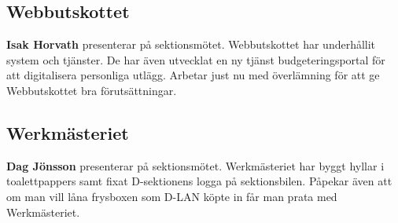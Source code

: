 \documentclass[../protokoll_varmote_2022.tex]{subfiles}
\begin{document}
\subsection{Webbutskottet}
\textbf{Isak Horvath} presenterar på sektionsmötet.
Webbutskottet har underhållit system och tjänster. De har även utvecklat en ny tjänst budgeteringsportal för att digitalisera personliga utlägg. Arbetar just nu med överlämning för att ge Webbutskottet bra förutsättningar.

\subsection{Werkmästeriet}
\textbf{Dag Jönsson} presenterar på sektionsmötet.
Werkmästeriet har byggt hyllar i toalettpappers samt fixat D-sektionens logga på sektionsbilen. Påpekar även att om man vill låna frysboxen som D-LAN köpte in får man prata med Werkmästeriet.
\end{document}
